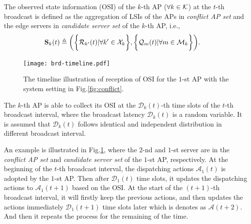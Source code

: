 \begin{definition}
    The observed state information (OSI) of the $k$-th AP ($\forall k\in\mathcal{K}$) at the $t$-th broadcast is defined as the aggregation of LSIs of the APs in \emph{conflict AP set} and the edge servers in \emph{candidate server set} of the $k$-th AP, i.e.,
    \begin{align}
        \mathbf{S}_{k}(t) &\triangleq
        \bigg(
            \bigg\{\mathcal{R}_{k'}(t) | \forall k'\in\mathcal{X}_{k}\bigg\},
            \bigg\{\mathcal{Q}_{m}(t) | \forall m\in\mathcal{M}_{k}\bigg\}
        \bigg).
    \end{align}
    \label{def:OSI}
\end{definition}

\begin{figure}[t]
    \centering
    \texttt{[image: brd-timeline.pdf]}
    \caption{The timeline illustration of reception of OSI for the $1$-st AP with the system setting in Fig.\ref{fig:conflict}.}
    \label{fig:brd-timeline}
\end{figure}

The $k$-th AP is able to collect its OSI at the $\mathcal{D}_{k}(t)$-th time slots of the $t$-th broadcast interval, where the broadcast latency $\mathcal{D}_{k}(t)$ is a random variable.
It is assumed that $\mathcal{D}_{k}(t)$ follows identical and independent distribution in different broadcast interval.

\begin{example}
    An example is illustrated in Fig.\ref{fig:brd-timeline}, where the $2$-nd and $1$-st server are in the \emph{conflict AP set} and \emph{candidate server set} of the $1$-st AP, respectively.
    At the beginning of the $t$-th broadcast interval, the dispatching actions $\mathcal{A}_{1}(t)$ is adopted by the $1$-st AP.
    Then after $\mathcal{D}_{1}(t)$ time slots, it updates the dispatching actions to $\mathcal{A}_{1}(t+1)$ based on the OSI.
    At the start of the $(t+1)$-th broadcast interval, it will firstly keep the previous actions, and then updates the actions immediately $\mathcal{D}_{1}(t+1)$ time slots later which is denotes as $\mathcal{A}(t+2)$.
    And then it repeats the process for the remaining of the time.
\end{example}
